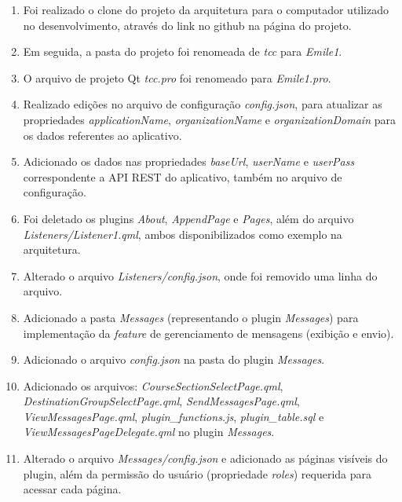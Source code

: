 \begin{enumerate}
	\item Foi realizado o clone do projeto da arquitetura para o computador utilizado no desenvolvimento, através do link no github na página do projeto.

	\item Em seguida, a pasta do projeto foi renomeada de \textit{tcc} para \textit{Emile1}.

	\item O arquivo de projeto Qt \textit{tcc.pro} foi renomeado para \textit{Emile1.pro}.

	\item Realizado edições no arquivo de configuração \textit{config.json}, para atualizar as propriedades \textit{applicationName}, \textit{organizationName} e \textit{organizationDomain} para os dados referentes ao aplicativo.

	\item Adicionado os dados nas propriedades \textit{baseUrl}, \textit{userName} e \textit{userPass} correspondente a API REST do aplicativo, também no arquivo de configuração.

	\item Foi deletado os plugins \textit{About}, \textit{AppendPage} e \textit{Pages}, além do arquivo \textit{Listeners/Listener1.qml}, ambos disponibilizados como exemplo na arquitetura.

	\item Alterado o arquivo \textit{Listeners/config.json}, onde foi removido uma linha do arquivo.

	\item Adicionado a pasta \textit{Messages} (representando o plugin \textit{Messages}) para implementação da \textit{feature} de gerenciamento de mensagens (exibição e envio).

	\item Adicionado o arquivo \textit{config.json} na pasta do plugin \textit{Messages}.

	\item Adicionado os arquivos: \textit{CourseSectionSelectPage.qml}, \textit{DestinationGroupSelectPage.qml}, \textit{SendMessagesPage.qml}, \textit{ViewMessagesPage.qml}, \textit{plugin_functions.js}, \textit{plugin_table.sql} e \textit{ViewMessagesPageDelegate.qml} no plugin \textit{Messages}.

	\item Alterado o arquivo \textit{Messages/config.json} e adicionado as páginas visíveis do plugin, além da permissão do usuário (propriedade \textit{roles}) requerida para acessar cada página.


\end{enumerate}
